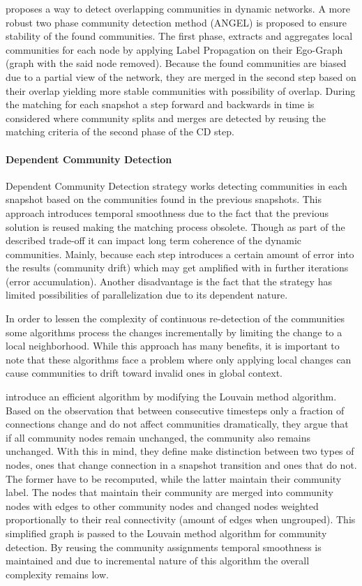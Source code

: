 \documentclass[
acmsmall,
nonacm,
screen,
acmthm]{../../scripts/pandoc/templates/acmart}
\begin{document}
\citet{rossettiANGELEfficientEffective2020} proposes a way to detect
overlapping communities in dynamic networks. A more robust two phase
community detection method (ANGEL) is proposed to ensure stability of
the found communities. The first phase, extracts and aggregates local
communities for each node by applying Label Propagation on their
Ego-Graph (graph with the said node removed). Because the found
communities are biased due to a partial view of the network, they are
merged in the second step based on their overlap yielding more stable
communities with possibility of overlap. During the matching for each
snapshot a step forward and backwards in time is considered where
community splits and merges are detected by reusing the matching
criteria of the second phase of the CD step.

\hypertarget{dependent-community-detection}{%
\paragraph{Dependent Community
Detection}\label{dependent-community-detection}}

Dependent Community Detection strategy works detecting communities in
each snapshot based on the communities found in the previous snapshots.
This approach introduces temporal smoothness due to the fact that the
previous solution is reused making the matching process obsolete. Though
as part of the described trade-off it can impact long term coherence of
the dynamic communities. Mainly, because each step introduces a certain
amount of error into the results (community drift) which may get
amplified with in further iterations (error accumulation). Another
disadvantage is the fact that the strategy has limited possibilities of
parallelization due to its dependent nature.

In order to lessen the complexity of continuous re-detection of the
communities some algorithms process the changes incrementally by
limiting the change to a local neighborhood. While this approach has
many benefits, it is important to note that these algorithms face a
problem where only applying local changes can cause communities to drift
toward invalid ones in global context.

\citet{heFastAlgorithmCommunity2015} introduce an efficient algorithm by
modifying the Louvain method algorithm. Based on the observation that
between consecutive timesteps only a fraction of connections change and
do not affect communities dramatically, they argue that if all community
nodes remain unchanged, the community also remains unchanged. With this
in mind, they define make distinction between two types of nodes, ones
that change connection in a snapshot transition and ones that do not.
The former have to be recomputed, while the latter maintain their
community label. The nodes that maintain their community are merged into
community nodes with edges to other community nodes and changed nodes
weighted proportionally to their real connectivity (amount of edges when
ungrouped). This simplified graph is passed to the Louvain method
algorithm for community detection. By reusing the community assignments
temporal smoothness is maintained and due to incremental nature of this
algorithm the overall complexity remains low.
\end{document}
